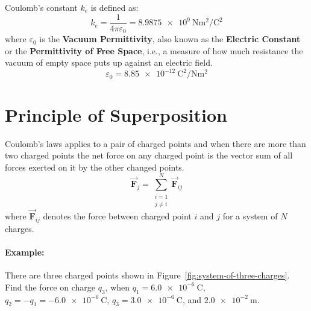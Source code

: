Coulomb's constant $k_e$ is defined as:
\begin{equation*}
  k_e = \frac{1}{4\pi\varepsilon_0} = \SI[per-mode = fraction]{8.9875e9}{\newton\meter\squared\per\coulomb\squared}
\end{equation*}
where $\varepsilon_0$ is the \textbf{Vacuum Permittivity}, also known as the
\textbf{Electric Constant} or the \textbf{Permittivity of Free Space}, i.e., a
measure of how much resistance the vacuum of empty space puts up against an
electric field.
\begin{equation*}
  \varepsilon_0 = \SI[per-mode = fraction]{8.85e-12}{\coulomb\squared\per\newton\meter\squared}
\end{equation*}


\section{Principle of Superposition}
Coulomb's laws applies to a pair of charged points and when there are more than
two charged points the net force on any charged point is the vector sum of all
forces exerted on it by the other changed points. 
\begin{equation*}
  \vec{\boldsymbol{F}}_{j} = \sum_{\substack{i=1 \\ j \neq i}}^{N} \vec{\boldsymbol{F}}_{ij}
\end{equation*}
where $\vec{\boldsymbol{F}}_{ij}$ denotes the force between charged point $i$ and $j$ for a system of $N$ charges.

\paragraph{Example:}
There are three charged points shown in Figure~\ref{fig:system-of-three-charges}. Find the force on charge $q_3$, when $q_1 = \SI{6.0e-6}{\coulomb}$, $q_2 = -q_1 = \SI{-6.0e-6}{\coulomb}$, $q_3 = \SI{3.0e-6}{\coulomb}$, and $\SI{2.0e-2}{\meter}$.

